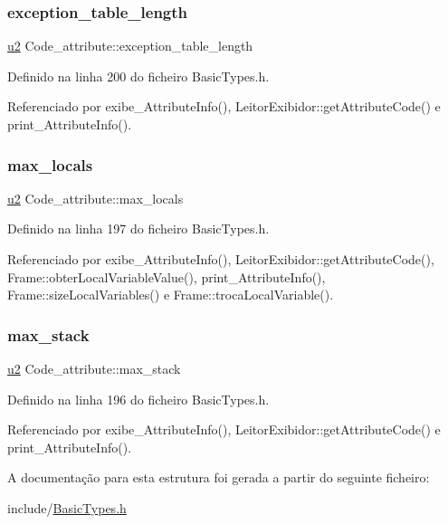 \subsubsection{\texorpdfstring{exception\+\_\+table\+\_\+length}{exception\_table\_length}}
{\footnotesize\ttfamily \hyperlink{BasicTypes_8h_a732cde1300aafb73b0ea6c2558a7a54f}{u2} Code\+\_\+attribute\+::exception\+\_\+table\+\_\+length}



Definido na linha 200 do ficheiro Basic\+Types.\+h.



Referenciado por exibe\+\_\+\+Attribute\+Info(), Leitor\+Exibidor\+::get\+Attribute\+Code() e print\+\_\+\+Attribute\+Info().

\mbox{\label{structCode__attribute_ad710ec86a1d37c6daa999383f8f2fd35}} 
\subsubsection{\texorpdfstring{max\+\_\+locals}{max\_locals}}
{\footnotesize\ttfamily \hyperlink{BasicTypes_8h_a732cde1300aafb73b0ea6c2558a7a54f}{u2} Code\+\_\+attribute\+::max\+\_\+locals}



Definido na linha 197 do ficheiro Basic\+Types.\+h.



Referenciado por exibe\+\_\+\+Attribute\+Info(), Leitor\+Exibidor\+::get\+Attribute\+Code(), Frame\+::obter\+Local\+Variable\+Value(), print\+\_\+\+Attribute\+Info(), Frame\+::size\+Local\+Variables() e Frame\+::troca\+Local\+Variable().

\mbox{\label{structCode__attribute_a300885ff1326f01f7c86e7b4425f0d35}} 
\subsubsection{\texorpdfstring{max\+\_\+stack}{max\_stack}}
{\footnotesize\ttfamily \hyperlink{BasicTypes_8h_a732cde1300aafb73b0ea6c2558a7a54f}{u2} Code\+\_\+attribute\+::max\+\_\+stack}



Definido na linha 196 do ficheiro Basic\+Types.\+h.



Referenciado por exibe\+\_\+\+Attribute\+Info(), Leitor\+Exibidor\+::get\+Attribute\+Code() e print\+\_\+\+Attribute\+Info().



A documentação para esta estrutura foi gerada a partir do seguinte ficheiro\+:\begin{DoxyCompactItemize}
\item 
include/\hyperlink{BasicTypes_8h}{Basic\+Types.\+h}\end{DoxyCompactItemize}
